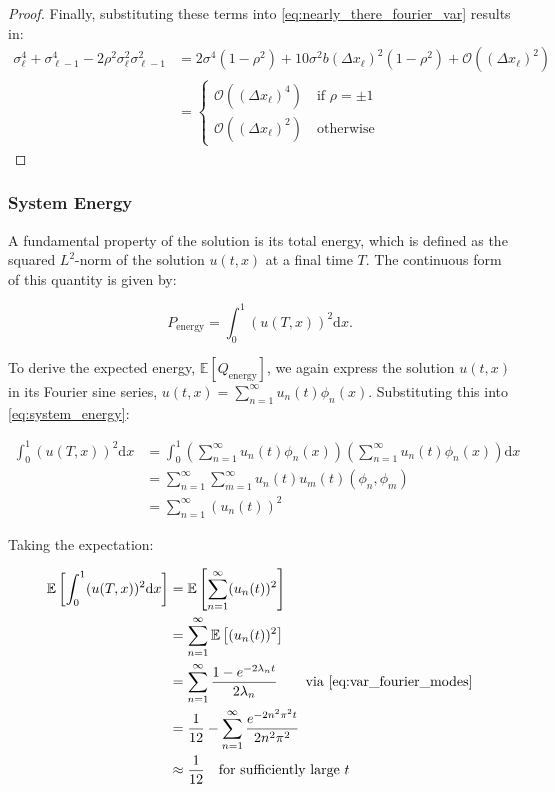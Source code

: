 \begin{proof}
    Finally, substituting these terms into \eqref{eq:nearly_there_fourier_var}
    results in:
    \begin{align*}
        \sigma_\ell^4 + \sigma_{\ell-1}^4 - 2\rho^2 \sigma_\ell^2 
        \sigma_{\ell-1}^2 &= 2 \sigma^4(1 - \rho^2) + 10 \sigma^2b 
        (\Delta x_\ell)^2(1 - \rho^2) + 
        \mathcal{O}\left((\Delta x_\ell)^2\right) \\
        &= \begin{cases}
        \mathcal{O}\left((\Delta x_\ell)^4\right) \quad \text{if } 
        \rho = \pm 1 \\
        \mathcal{O}\left((\Delta x_\ell)^2\right) \quad \text{otherwise}
        \end{cases}
    \end{align*}

\end{proof}


\subsubsection{System Energy}\label{sec:system_energy}

A fundamental property of the solution is its total energy, which is defined 
as the squared $L^2$-norm of the solution $u(t,x)$ at a final time $T$. The 
continuous form of this quantity is given by:

\begin{equation}\label{eq:system_energy}
P_{\text{energy}} = \int_0^1 (u(T,x))^2 \mathrm{d}x.
\end{equation}

To derive the expected energy, $\mathbb{E}[Q_{\text{energy}}]$, 
we again express the solution 
$u(t,x)$ in its Fourier sine series,
$u(t,x) = \sum_{n=1}^\infty u_n(t)\phi_n(x)$. Substituting this into 
\eqref{eq:system_energy}:

\begin{align*}
    \int_0^1 (u(T,x))^2 \mathrm{d}x &= 
    \int_0^1\left(\sum_{n=1}^\infty u_n(t)\phi_n(x)\right)
    \left(\sum_{n=1}^\infty u_n(t)\phi_n(x)\right) \mathrm{d}x \\
    &= \sum_{n=1}^\infty \sum_{m=1}^\infty u_n(t) u_m(t) (\phi_n, \phi_m) \\
    &= \sum_{n=1}^\infty (u_n(t))^2
\end{align*}

Taking the expectation:

\begin{align}
    \mathbb{E}\left[\int_0^1 (u(T,x))^2 \mathrm{d}x\right] &= 
    \mathbb{E}\left[\sum_{n=1}^\infty (u_n(t))^2\right] 
    \label{eq:parseval}
    \\
    &= \sum_{n=1}^\infty \mathbb{E}\left[(u_n(t))^2\right] 
    \nonumber
    \\
    &= \sum_{n=1}^\infty \frac{1-e^{-2\lambda_n t}}{2\lambda_n}
    \qquad \text{via } \eqref{eq:var_fourier_modes}
    \nonumber
    \\
    &= \frac{1}{12} - \sum_{n=1}^\infty \frac{e^{-2n^2 \pi^2 t}}{2 n^2 \pi^2}
    \nonumber
    \\
    &\approx \frac{1}{12} \quad \text{for sufficiently large } t
    \label{eq:she_energy_analytic_soln}
\end{align}
